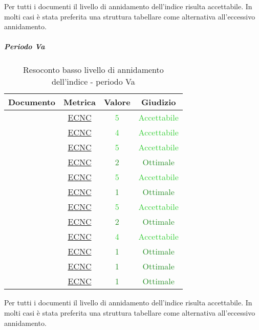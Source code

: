					Per tutti i documenti il livello di annidamento dell'indice risulta accettabile. In molti casi è stata preferita una struttura tabellare come alternativa all'eccessivo annidamento.
					
					\subparagraph{Periodo Va}
					
					\begin{table}[H]
						\centering
						\small
						\begin{tabular}{c | c | c | c}
							\hline
							\textbf{Documento} & \textbf{Metrica}    & \textbf{Valore} & \textbf{Giudizio} \\ \hline
							\pdpv        & \hyperref[MLEC]{ECNC} & \textcolor{LimeGreen}{5} & \textcolor{LimeGreen}{Accettabile} \\
							\pdqv        & \hyperref[MLEC]{ECNC} & \textcolor{LimeGreen}{4} & \textcolor{LimeGreen}{Accettabile} \\
							\ndpv        & \hyperref[MLEC]{ECNC} & \textcolor{LimeGreen}{5} & \textcolor{LimeGreen}{Accettabile} \\
							\adrv        & \hyperref[MLEC]{ECNC}  & \textcolor{ForestGreen}{2} & \textcolor{ForestGreen}{Ottimale} \\
							\stv		& \hyperref[MLEC]{ECNC}  & \textcolor{LimeGreen}{5} & \textcolor{LimeGreen}{Accettabile} \\
							\glv       & \hyperref[MLEC]{ECNC} & \textcolor{ForestGreen}{1} & \textcolor{ForestGreen}{Ottimale} \\
							\ddpv        & \hyperref[MLEC]{ECNC} & \textcolor{LimeGreen}{5} & \textcolor{LimeGreen}{Accettabile} \\
							\manutv        & \hyperref[MLEC]{ECNC} & \textcolor{ForestGreen}{2} & \textcolor{ForestGreen}{Ottimale} \\
							\manmanv        & \hyperref[MLEC]{ECNC} & \textcolor{LimeGreen}{4} & \textcolor{LimeGreen}{Accettabile} \\
							\vnovei       & \hyperref[MLEC]{ECNC}& \textcolor{ForestGreen}{1} & \textcolor{ForestGreen}{Ottimale} \\
							\vcinquee       & \hyperref[MLEC]{ECNC}& \textcolor{ForestGreen}{1} & \textcolor{ForestGreen}{Ottimale} \\
							\vseie       & \hyperref[MLEC]{ECNC}& \textcolor{ForestGreen}{1} & \textcolor{ForestGreen}{Ottimale} \\
						\end{tabular}
						\caption{Resoconto basso livello di annidamento dell'indice - periodo Va}
						\label{tab_resoconto_basso_livello_di_annidamento_indice_PVA}
					\end{table}
				Per tutti i documenti il livello di annidamento dell'indice risulta accettabile. In molti casi è stata preferita una struttura tabellare come alternativa all'eccessivo annidamento.
